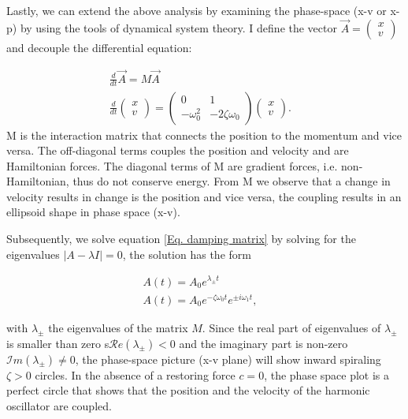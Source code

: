 \documentclass{article}
\begin{document}
Lastly, we can extend the above analysis by examining the phase-space (x-v or x-p) by using the tools of dynamical system theory. I define the vector $\vec{A} = \begin{pmatrix}
    x\\
    v
\end{pmatrix}$ and decouple the differential equation:

\begin{align}
    \frac{d}{dt}\vec{A} = M\vec{A} & \\
    \frac{d}{dt}
    \begin{pmatrix}
        x\\
        v
    \end{pmatrix}  = \begin{pmatrix}
        0 & 1 \\
         -\omega_0^2 & -2\zeta\omega_0
    \end{pmatrix}\begin{pmatrix}
        x\\
        v
    \end{pmatrix}.
    \label{Eq. damping matrix}
\end{align}
M is the interaction matrix that connects the position to the momentum and vice versa. The off-diagonal terms couples the position and velocity and are Hamiltonian forces. The diagonal terms of M are gradient forces, i.e. non-Hamiltonian, thus do not conserve energy. From M we observe that a change in velocity results in change is the position and vice versa, the coupling results in an ellipsoid shape in phase space (x-v).

Subsequently, we solve equation \ref{Eq. damping matrix} by solving for the eigenvalues $|A-\lambda I| = 0$, the solution has the form

\begin{align}
    A(t) = A_0 e^{\lambda_{\pm}t} & \\
    A(t) = A_0 e^{-\zeta \omega_0 t}e^{\pm i\omega_1 t},
\end{align}

with $\lambda_{\pm}$ the eigenvalues of the matrix $M$.
Since the real part of eigenvalues of $\lambda_{\pm}$ is smaller than zero s$\mathcal{R}e(\lambda_{\pm}) < 0 $ and the imaginary part is non-zero $\mathcal{I}m(\lambda_{\pm})\neq 0$, the phase-space picture (x-v plane) will show inward spiraling $\zeta>0$ circles. In the absence of a restoring force $c = 0$, the phase space plot is a perfect circle that shows that the position and the velocity of the harmonic oscillator are coupled. 
\end{document}
